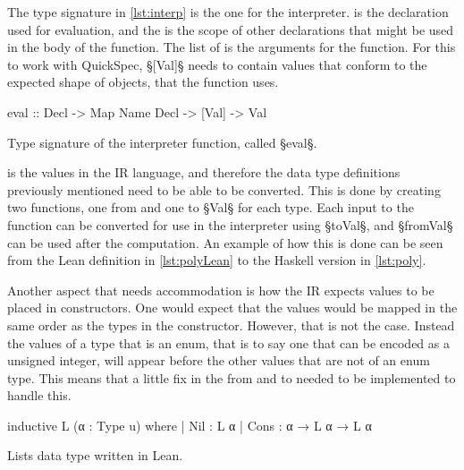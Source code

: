 The type signature in \cref{lst:interp} is the one for the interpreter.
 is the declaration used for evaluation, and the  is the scope of other declarations that might be used in the body of the function.
The list of  is the arguments for the function.
For this to work with QuickSpec, §[Val]§ needs to contain values that conform to the expected shape of objects, that the function uses.

\begin{listing}[H]
\begin{HaskellCode}
eval :: Decl -> Map Name Decl -> [Val] -> Val
\end{HaskellCode}
\caption{Type signature of the interpreter function, called §eval§.}
\label{lst:interp}
\end{listing}

\vspace{-0.7cm}

 is the values in the IR language, and therefore the data type definitions previously mentioned need to be able to be converted.
This is done by creating two functions, one from and one to §Val§ for each type.
Each input to the function can be converted for use in the interpreter using §toVal§, and §fromVal§ can be used after the computation.
An example of how this is done can be seen from the Lean definition in \cref{lst:polyLean} to the Haskell version in \cref{lst:poly}.

Another aspect that needs accommodation is how the IR expects values to be placed in constructors.
One would expect that the values would be mapped in the same order as the types in the constructor.
However, that is not the case.
Instead the values of a type that is an enum, that is to say one that can be encoded as a unsigned integer, will appear before the other values that are not of an enum type.
This means that a little fix in the from and to  needed to be implemented to handle this.

\begin{listing}[H]
\begin{LeanCode}
inductive L (α : Type u) where
  | Nil : L α
  | Cons : α → L α → L α
\end{LeanCode}
\caption{Lists data type written in Lean.}
\label{lst:polyLean}
\end{listing}

\vspace{-0.55cm}

